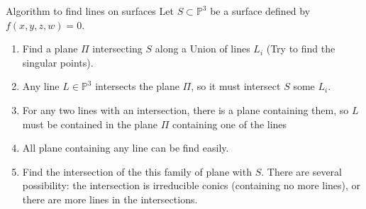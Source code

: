 \documentclass[twocolumn]{article}
\renewcommand{\P}{\mathbb{P}}
\theoremstyle{definition}
\theoremstyle{remark}
\begin{document}
\begin{fthm}{Algorithm to find lines on surfaces}{}
	Let $S \subset \P^3$ be a surface defined by $f(x,y,z,w) = 0$. 
	\begin{enumerate}
		\item Find a plane $\Pi$ intersecting $S$ along a Union of lines $L_i$ (Try to find the singular points).
		\item Any line $L \in \P^3$ intersects the plane $\Pi$, so it must intersect $S$ some $L_i$.
		\item For any two lines with an intersection, there is a plane containing them, so $L$ must be contained in the plane $\Pi$ containing one of the lines
		\item All plane containing any line can be find easily.
		\item Find the intersection of the this family of plane with $S$. There are several possibility: the intersection is irreducible conics (containing no more lines), or there are more lines in the intersections. 
	\end{enumerate}
\end{fthm}
\end{document}

